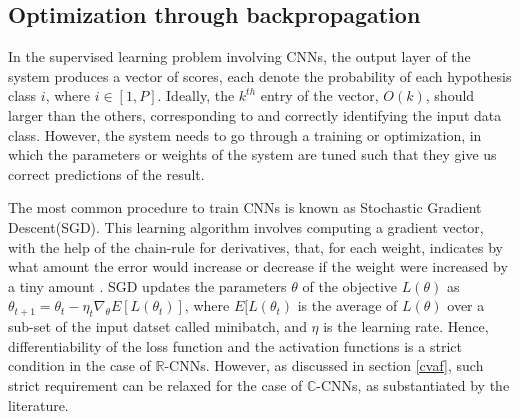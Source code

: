  \subsection{Optimization through backpropagation}\label{optbp}
 In the supervised learning problem involving CNNs, the output layer of the system produces a vector of scores, each denote the probability of each hypothesis class $i$, where $i \in [1,P]$. Ideally, the $k^{th}$ entry of the vector, $O(k)$, should larger than the others, corresponding to and correctly identifying the input data class. However, the system needs to go through a training or optimization, in which the parameters or weights of the system are tuned such that they give us correct predictions of the result.
 
 The most common procedure to train CNNs is known as Stochastic Gradient Descent(SGD). This learning algorithm involves computing a gradient vector,  with the help of the chain-rule for derivatives, that, for each weight, indicates by what amount the error would increase or decrease if the weight were increased by a tiny amount \cite{nature}. SGD updates the parameters $\theta$ of the objective $L(\theta)$ as $\theta_{t+1} = \theta_{t} - \eta_{t}\nabla_{\theta}E[L(\theta_{t})]$,
 where $E[L(\theta_{t})$ is the average of $L(\theta)$ over a sub-set of the input datset called minibatch, and $\eta$ is the learning rate. Hence, differentiability of the loss function and the activation functions is a strict condition in the case of $\mathbb{R}$-CNNs. However, as discussed in section \ref{cvaf}, such strict requirement can be relaxed for the case of $\mathbb{C}$-CNNs, as substantiated by the literature. 
    
 





